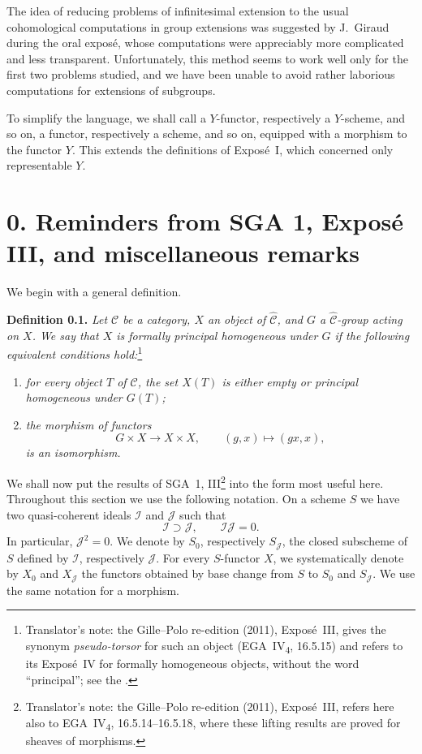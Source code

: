 The idea of reducing problems of infinitesimal extension to the usual
cohomological computations in group extensions was suggested by
J.~Giraud during the oral expos\'e, whose computations were appreciably
more complicated and less transparent. Unfortunately, this method seems
to work well only for the first two problems studied, and we have been
unable to avoid rather laborious computations for extensions of
subgroups.

To simplify the language, we shall call a \(Y\)-functor, respectively a
\(Y\)-scheme, and so on, a functor, respectively a scheme, and so on,
equipped with a morphism to the functor \(Y\). This extends the
definitions of Expos\'e~I, which concerned only representable \(Y\).

\section*{0. Reminders from SGA 1, Expos\'e III, and miscellaneous remarks}

We begin with a general definition.

\medskip
{}\noindent\textbf{Definition 0.1.}
\textit{Let \(\mathscr C\) be a category, \(X\) an object of
\(\widehat{\mathscr C}\), and \(G\) a
\(\widehat{\mathscr C}\)-group acting on \(X\). We say that \(X\) is
\emph{formally principal homogeneous} under \(G\) if the following equivalent
conditions hold:}\footnote{Translator's note: the Gille--Polo re-edition (2011), Exposé~III, gives the synonym
\emph{pseudo-torsor} for such an object (EGA~IV\textsubscript{4}, 16.5.15) and
refers to its Exposé~IV for formally homogeneous objects, without the word
``principal''; see the .}
\begin{enumerate}
\item[(i)] \textit{for every object \(T\) of \(\mathscr C\), the set
  \(X(T)\) is either empty or principal homogeneous under \(G(T)\);}
\item[(ii)] \textit{the morphism of functors
  \[
    G\times X\longrightarrow X\times X,
    \qquad (g,x)\longmapsto(gx,x),
  \]
  is an isomorphism.}
\end{enumerate}

We shall now put the results of SGA~1, III\footnote{Translator's note: the Gille--Polo re-edition (2011), Exposé~III, refers here
also to EGA~IV\textsubscript{4}, 16.5.14--16.5.18, where these lifting results
are proved for sheaves of morphisms.} into the form most
useful here. Throughout this section we use the following notation. On a
scheme \(S\) we have two quasi-coherent ideals \(\mathscr I\) and
\(\mathscr J\) such that
\[
 \mathscr I\supset\mathscr J,
 \qquad
 \mathscr I\mathscr J=0.
\]
In particular, \(\mathscr J^2=0\). We denote by \(S_0\), respectively
\(S_{\mathscr J}\), the closed subscheme of \(S\) defined by
\(\mathscr I\), respectively \(\mathscr J\). For every \(S\)-functor
\(X\), we systematically denote by \(X_0\) and \(X_{\mathscr J}\) the
functors obtained by base change from \(S\) to \(S_0\) and
\(S_{\mathscr J}\). We use the same notation for a morphism.

